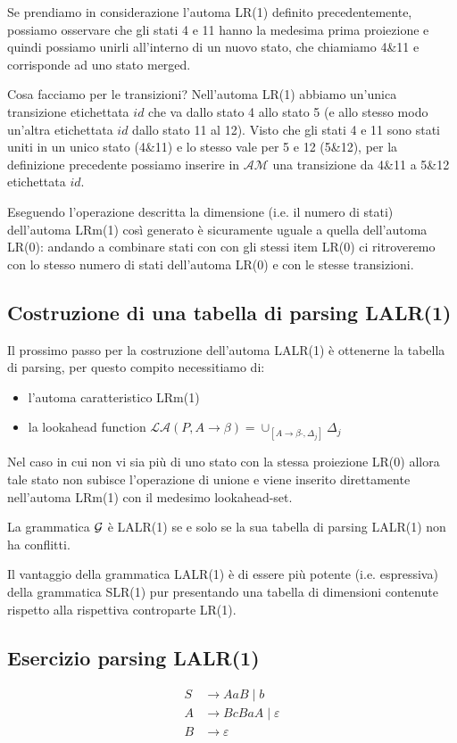 \documentclass[class=book, crop=false, oneside, 12pt]{standalone}
\begin{document}
Se prendiamo in considerazione l'automa LR(1) definito precedentemente, possiamo osservare che gli stati 4 e 11 hanno la medesima prima proiezione e quindi possiamo unirli all'interno di un nuovo stato, che chiamiamo 4\&11 e corrisponde ad uno stato merged.

Cosa facciamo per le transizioni? Nell'automa LR(1) abbiamo un'unica transizione etichettata \(id\) che va dallo stato 4 allo stato 5 (e allo stesso modo un'altra etichettata \(id\) dallo stato 11 al 12). Visto che gli stati 4 e 11 sono stati uniti in un unico stato (4\&11) e lo stesso vale per 5 e 12 (5\&12), per la definizione precedente possiamo inserire in \(\mathcal{AM}\) una transizione da 4\&11 a 5\&12 etichettata \(id\).

Eseguendo l'operazione descritta la dimensione (i.e. il numero di stati) dell'automa LRm(1) così generato è sicuramente uguale a quella dell'automa LR(0): andando a combinare stati con con gli stessi item LR(0) ci ritroveremo con lo stesso numero di stati dell'automa LR(0) e con le stesse transizioni. 

\subsection{Costruzione di una tabella di parsing LALR(1)}
\label{subsec:lalr1-parsing-table}

Il prossimo passo per la costruzione dell'automa LALR(1) è ottenerne la tabella di parsing, per questo compito necessitiamo di:

\begin{itemize}
    \item l'automa caratteristico LRm(1)
    \item la lookahead function \(\mathcal{LA}(P, A \to \beta) = \cup_{[A \to \beta \cdot, \Delta_j]} \Delta_j\)
\end{itemize}

Nel caso in cui non vi sia più di uno stato con la stessa proiezione LR(0) allora tale stato non subisce l'operazione di unione e viene inserito direttamente nell'automa LRm(1) con il medesimo lookahead-set.

La grammatica \(\mathcal{G}\) è LALR(1) se e solo se la sua tabella di parsing LALR(1) non ha conflitti. 

Il vantaggio della grammatica LALR(1) è di essere più potente (i.e. espressiva) della grammatica SLR(1) pur presentando una tabella di dimensioni contenute rispetto alla rispettiva controparte LR(1). 

\subsection*{Esercizio parsing LALR(1)}
\begin{align*}
    S &\to AaB \mid b \\
    A &\to BcBaA \mid \varepsilon \\
    B &\to \varepsilon
\end{align*}
\end{document}
